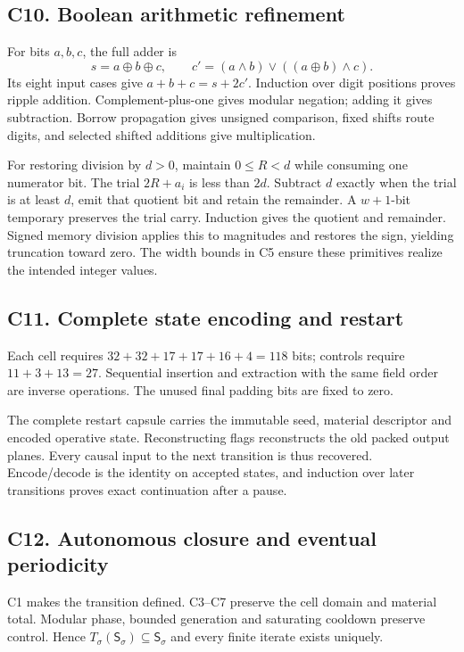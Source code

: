 \documentclass[11pt,a4paper]{article}
\numberwithin{equation}{section}
\newcommand{\xor}{\mathbin{\oplus}}
\begin{document}
\subsection*{C10. Boolean arithmetic refinement}
For bits $a,b,c$, the full adder is
\begin{equation}
s=a\xor b\xor c,
\qquad c'=(a\land b)\lor((a\xor b)\land c).
\end{equation}
Its eight input cases give $a+b+c=s+2c'$. Induction over digit positions proves ripple addition. Complement-plus-one gives modular negation; adding it gives subtraction. Borrow propagation gives unsigned comparison, fixed shifts route digits, and selected shifted additions give multiplication.

For restoring division by $d>0$, maintain $0\le R<d$ while consuming one numerator bit. The trial $2R+a_i$ is less than $2d$. Subtract $d$ exactly when the trial is at least $d$, emit that quotient bit and retain the remainder. A $w+1$-bit temporary preserves the trial carry. Induction gives the quotient and remainder. Signed memory division applies this to magnitudes and restores the sign, yielding truncation toward zero. The width bounds in C5 ensure these primitives realize the intended integer values.

\subsection*{C11. Complete state encoding and restart}
Each cell requires $32+32+17+17+16+4=118$ bits; controls require $11+3+13=27$. Sequential insertion and extraction with the same field order are inverse operations. The unused final padding bits are fixed to zero.

The complete restart capsule carries the immutable seed, material descriptor and encoded operative state. Reconstructing flags reconstructs the old packed output planes. Every causal input to the next transition is thus recovered. Encode/decode is the identity on accepted states, and induction over later transitions proves exact continuation after a pause.

\subsection*{C12. Autonomous closure and eventual periodicity}
C1 makes the transition defined. C3--C7 preserve the cell domain and material total. Modular phase, bounded generation and saturating cooldown preserve control. Hence $T_\sigma(\mathsf S_\sigma)\subseteq\mathsf S_\sigma$ and every finite iterate exists uniquely.
\end{document}
